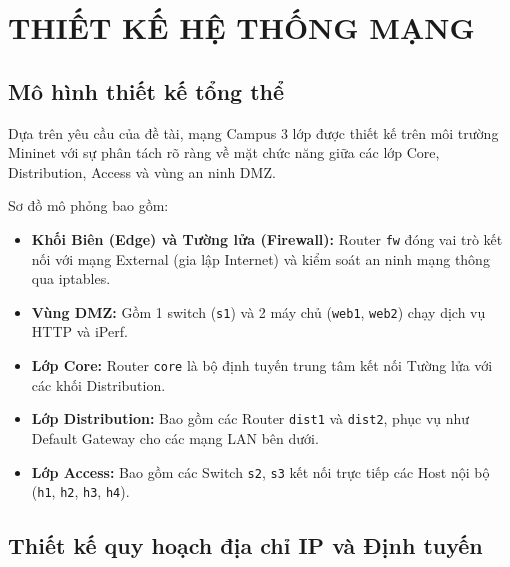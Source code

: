 \section{THIẾT KẾ HỆ THỐNG MẠNG}

\subsection{Mô hình thiết kế tổng thể}
Dựa trên yêu cầu của đề tài, mạng Campus 3 lớp được thiết kế trên môi trường Mininet với sự phân tách rõ ràng về mặt chức năng giữa các lớp Core, Distribution, Access và vùng an ninh DMZ. 


Sơ đồ mô phỏng bao gồm:
\begin{itemize}
    \item \textbf{Khối Biên (Edge) và Tường lửa (Firewall):} Router \texttt{fw} đóng vai trò kết nối với mạng External (gia lập Internet) và kiểm soát an ninh mạng thông qua iptables.
    \item \textbf{Vùng DMZ:} Gồm 1 switch (\texttt{s1}) và 2 máy chủ (\texttt{web1}, \texttt{web2}) chạy dịch vụ HTTP và iPerf.
    \item \textbf{Lớp Core:} Router \texttt{core} là bộ định tuyến trung tâm kết nối Tường lửa với các khối Distribution.
    \item \textbf{Lớp Distribution:} Bao gồm các Router \texttt{dist1} và \texttt{dist2}, phục vụ như Default Gateway cho các mạng LAN bên dưới.
    \item \textbf{Lớp Access:} Bao gồm các Switch \texttt{s2}, \texttt{s3} kết nối trực tiếp các Host nội bộ (\texttt{h1}, \texttt{h2}, \texttt{h3}, \texttt{h4}).
\end{itemize}

\subsection{Thiết kế quy hoạch địa chỉ IP và Định tuyến}

